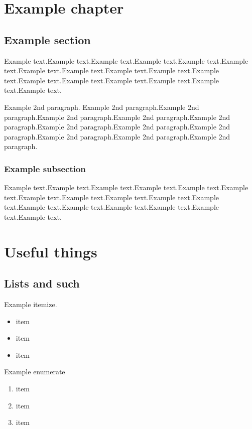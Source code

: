 \documentclass[12pt]{report}
\begin{document}
\tableofcontents
\chapter{Example chapter}
\section{Example section}
Example text.Example text.Example text.Example text.Example text.Example text.Example text.Example text.Example text.Example text.Example text.Example text.Example text.Example text.Example text.Example text.Example text.
\par
Example 2nd paragraph. Example 2nd paragraph.Example 2nd paragraph.Example 2nd paragraph.Example 2nd paragraph.Example 2nd paragraph.Example 2nd paragraph.Example 2nd paragraph.Example 2nd paragraph.Example 2nd paragraph.Example 2nd paragraph.Example 2nd paragraph. \par
\subsection{Example subsection}
Example text.Example text.Example text.Example text.Example text.Example text.Example text.Example text.Example text.Example text.Example text.Example text.Example text.Example text.Example text.Example text.Example text.

\chapter{Useful things}
\label{sec:useful_things}
\section{Lists and such}

Example itemize.
\begin{itemize}
\item item
\item item
\item item
\end{itemize}

Example enumerate
\begin{enumerate}
\item item
\item item
\item item
\end{enumerate}
\end{document}
